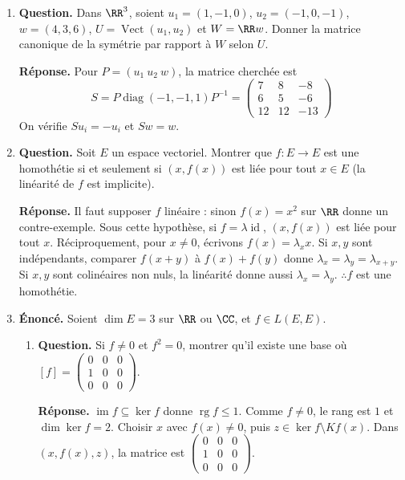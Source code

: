 \documentclass[12pt, a4paper]{article}
\begin{document}
\begin{enumerate}[label=7.\arabic*., start=68]
\begin{minipage}[t]{\linewidth}
\begin{enumerate}[\arabic*.]
\end{enumerate}
\end{minipage}

  \item \begin{minipage}[t]{\linewidth}\raggedright
\textbf{Question.} Dans $\RR^3$, soient $u_1=(1,-1,0)$, $u_2=(-1,0,-1)$, $w=(4,3,6)$, $U=\operatorname{Vect}(u_1,u_2)$ et $W=\RR w$. Donner la matrice canonique de la symétrie par rapport à $W$ selon $U$.
\par\smallskip
\textbf{Réponse.} Pour $P=(u_1\ u_2\ w)$, la matrice cherchée est
    \[
      S=P\operatorname{diag}(-1,-1,1)P^{-1}
       =\begin{pmatrix}7&8&-8\\6&5&-6\\12&12&-13\end{pmatrix}
    \]
    On vérifie $Su_i=-u_i$ et $Sw=w$.
\end{minipage}

  \item \begin{minipage}[t]{\linewidth}\raggedright
\textbf{Question.} Soit $E$ un espace vectoriel. Montrer que $f:E\to E$ est une homothétie si et seulement si $(x,f(x))$ est liée pour tout $x\in E$ (la linéarité de $f$ est implicite).
\par\smallskip
\textbf{Réponse.} Il faut supposer $f$ linéaire : sinon $f(x)=x^2$ sur $\RR$ donne un contre-exemple.
    Sous cette hypothèse, si $f=\lambda\operatorname{id}$, $(x,f(x))$ est liée pour tout $x$.
    Réciproquement, pour $x\neq0$, écrivons $f(x)=\lambda_xx$.
    Si $x,y$ sont indépendants, comparer $f(x+y)$ à $f(x)+f(y)$ donne
    $\lambda_x=\lambda_y=\lambda_{x+y}$.
    Si $x,y$ sont colinéaires non nuls, la linéarité donne aussi $\lambda_x=\lambda_y$.
    $\therefore f$ est une homothétie.
\end{minipage}

  \item \begin{minipage}[t]{\linewidth}\raggedright
\textbf{Énoncé.} Soient $\dim E=3$ sur $\RR$ ou $\CC$, et $f\in L(E,E)$.

\begin{enumerate}[\arabic*.]
        \item \textbf{Question.} Si $f\neq0$ et $f^2=0$, montrer qu’il existe une base où $[f]=\begin{pmatrix}0&0&0\\1&0&0\\0&0&0\end{pmatrix}$.
\par\smallskip
\textbf{Réponse.} $\operatorname{im}f\subseteq\ker f$ donne $\operatorname{rg}f\leq1$.
        Comme $f\neq0$, le rang est $1$ et $\dim\ker f=2$.
        Choisir $x$ avec $f(x)\neq0$, puis $z\in\ker f\setminus Kf(x)$.
        Dans $(x,f(x),z)$, la matrice est $\begin{pmatrix}0&0&0\\1&0&0\\0&0&0\end{pmatrix}$.


\end{enumerate}
\end{minipage}
\end{enumerate}
\end{document}
